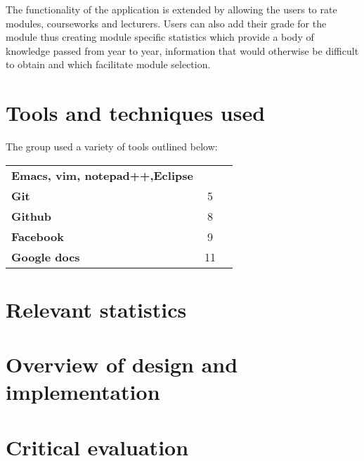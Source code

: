 \documentclass[12pt,a4paper,titlepage]{article}
\begin{document}
The functionality of the application is extended by allowing the users to rate modules, courseworks and lecturers. Users can also add their grade for the module thus creating module specific statistics which provide a body of knowledge passed from year to year, information that would otherwise be difficult to obtain and which facilitate module selection. 
\section{Tools and techniques used}
The group used a variety of tools outlined below:\\
\begin{tabular}{ l c r }
  \bf{Emacs, vim, notepad++,Eclipse} &  \\
  \bf{Git} & 5 \\
  \bf{Github} & 8 \\
  \bf{Facebook} & 9 \\
  \bf{Google docs} & 11 \\
  
\end{tabular}
\section{Relevant statistics}
\section{Overview of design and implementation}
\section{Critical evaluation}
\end{document}
